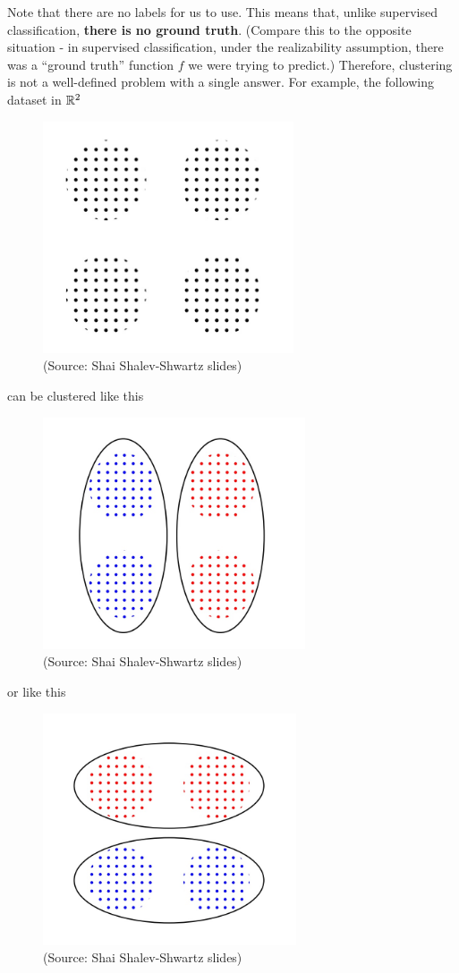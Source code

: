 Note that there are no labels for us to use. This means that, unlike supervised
classification, {\bf there is no ground truth}. (Compare this to the opposite
  situation - in supervised classification, under the realizability assumption,
there was a ``ground truth'' function $f$ we were trying to predict.) 
Therefore, clustering is not a
well-defined problem with a single answer. For example, the following dataset in
$\mathbb{R}^2$ 
\begin{figure}[H]
      \centering
      \includegraphics[height=2.7in]{cluster0.jpeg}        
      \caption{(Source: Shai Shalev-Shwartz slides)}
    \end{figure}
%
    can be clustered like this
    \begin{figure}[H]
      \centering
      \includegraphics[height=2.7in]{cluster1.jpeg}        
      \caption{(Source: Shai Shalev-Shwartz slides)}
    \end{figure}
%
    or like this
    \begin{figure}[H]
      \centering
      \includegraphics[height=2.7in]{cluster2.jpeg}        
      \caption{(Source: Shai Shalev-Shwartz slides)}
    \end{figure}

